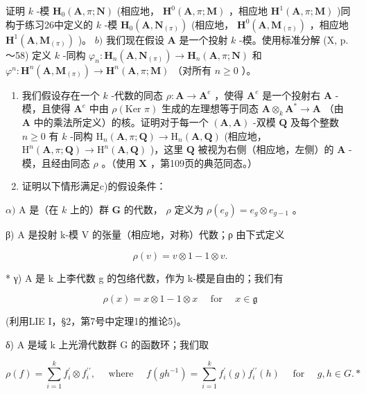 证明 \(k\) -模 \(\mathbf{H}_0(\mathbf{A}, \pi; \mathbf{N})\) (相应地， \(\mathbf{H}^0(\mathbf{A}, \pi; \mathbf{M})\) ，相应地 \(\mathbf{H}^1(\mathbf{A}, \pi; \mathbf{M})\) )同构于练习26中定义的 \(k\) -模 \(\mathbf{H}_0(\mathbf{A}, \mathbf{N}_{(\pi)})\) (相应地， \(\mathbf{H}^0(\mathbf{A}, \mathbf{M}_{(\pi)})\) ，相应地 \(\mathbf{H}^1(\mathbf{A}, \mathbf{M}_{(\pi)})\) )。 \(b)\) 我们现在假设 \(\mathbf{A}\) 是一个投射 \(k\) -模。使用标准分解 (X, p.～58) 定义 \(k\) -同构 \(\varphi_n: \mathbf{H}_n(\mathbf{A}, \mathbf{N}_{(\pi)}) \to \mathbf{H}_n(\mathbf{A}, \pi; \mathbf{N})\) 和 \(\varphi^n: \mathbf{H}^n(\mathbf{A}, \mathbf{M}_{(\pi)}) \to \mathbf{H}^n(\mathbf{A}, \pi; \mathbf{M})\) （对所有 \(n \geqslant 0\) ）。

\begin{enumerate}
\def\labelenumi{\alph{enumi})}
\setcounter{enumi}{2}
\item
  我们假设存在一个 \(k\) -代数的同态 \(\rho: \mathbf{A} \to \mathbf{A}^e\) ，使得 \(\mathbf{A}^e\) 是一个投射右 \(\mathbf{A}\) -模，且使得 \(\mathbf{A}^e\) 中由 \(\rho(\text{Ker } \pi)\) 生成的左理想等于同态 \(\mathbf{A} \otimes_k \mathbf{A}^* \to \mathbf{A}\) （由 \(\mathbf{A}\) 中的乘法所定义）的核。证明对于每一个 \((\mathbf{A}, \mathbf{A})\) -双模 \(\mathbf{Q}\) 及每个整数 \(n \geqslant 0\) 有 \(k\) -同构 \(\mathrm{H}_n(\mathbf{A}, \pi; \mathbf{Q}) \to \mathrm{H}_n(\mathbf{A}, \mathbf{Q})\) (相应地， \(\mathrm{H}^n(\mathbf{A}, \pi; \mathbf{Q}) \to \mathrm{H}^n(\mathbf{A}, \mathbf{Q})\) )，这里 \(\mathbf{Q}\) 被视为右侧（相应地，左侧）的 \(\mathbf{A}\) -模，且经由同态 \(\rho\) 。（使用 \(\mathbf{X}\) ，第109页的典范同态。）
\item
  证明以下情形满足c)的假设条件：
\end{enumerate}

\(\alpha)\) A 是（在 \(k\) 上的）群 \(\mathbf{G}\) 的代数， \(\rho\) 定义为 \(\rho(e_g) = e_g \otimes e_{g-1}\) 。

β) A 是投射 k-模 V 的张量（相应地，对称）代数；ρ 由下式定义

\[
\rho (v) = v \otimes 1 - 1 \otimes v.
\]

* γ) A 是 k 上李代数 g 的包络代数，作为 k-模是自由的；我们有

\[
\rho (x) = x \otimes 1 - 1 \otimes x \quad \text { for } \quad x \in \mathfrak {g}
\]

(利用LIE I，§2，第7号中定理1的推论5)。

δ) A 是域 k 上光滑代数群 G 的函数环；我们取

\[
\rho (f) = \sum_ {i = 1} ^ {k} f _ {i} ^ {\prime} \otimes f _ {i} ^ {\prime \prime}, \quad \text { where } \quad f (g h ^ {- 1}) = \sum_ {i = 1} ^ {k} f _ {i} ^ {\prime} (g) f _ {i} ^ {\prime \prime} (h) \quad \text { for } \quad g, h \in G. *
\]

